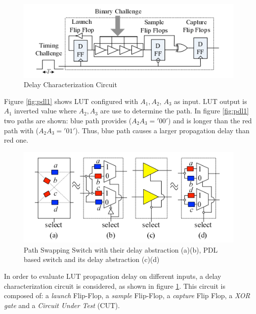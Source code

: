 \documentclass[../tesi.tex]{subfiles}
\begin{document}
\begin{figure}
\centering
\includegraphics[scale=0.50]{images/delaycharacterizationcircuit.png}
\caption{Delay Characterization Circuit}
\label{fig:pdl2}
\end{figure}
Figure \ref{fig:pdl1} shows LUT configured with $A_{1}, A_{2}$, $A_{3}$ as input. LUT output is $A_{1}$ inverted value where $A_{2}, A_{3}$ are use to determine the path. In figure \ref{fig:pdl1} two paths are shown: blue path provides ($A_{2}A_{3}='00'$) and is longer than the red path with ($A_{2}A_{3}='01'$). Thus, blue path causes a larger propagation delay than red one. 
\begin{figure}
\centering
\includegraphics[scale=0.50]{images/pdl2.png}
\caption{Path Swapping Switch with their delay abstraction (a)(b), PDL based switch and its delay abstraction (c)(d)}
\label{fig:pdl3}
\end{figure}
In order to evaluate LUT propagation delay on different inputs, a delay characterization circuit is considered, as shown in figure \ref{fig:pdl2}. This circuit is composed of: a \emph{launch} Flip-Flop, a  \emph{sample} Flip-Flop, a \emph{capture} Flip Flop, a \emph{XOR gate} and a \emph{Circuit Under Test} (CUT).
\end{document}

